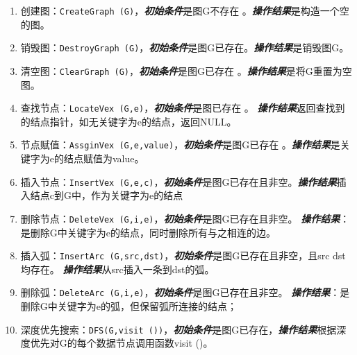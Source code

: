 \begin{enumerate}
\item 创建图：\texttt{CreateGraph (G)}，\newline \textbf{\emph{初始条件}}是图G不存在 。\newline \textbf{\emph{操作结果}}是构造一个空的图。
\item 销毁图：\texttt{DestroyGraph (G)}，\newline \textbf{\emph{初始条件}}是图G已存在。\newline \textbf{\emph{操作结果}}是销毁图G。
\item 清空图：\texttt{ClearGraph (G)}，\newline \textbf{\emph{初始条件}}是图G已存在 。\newline \textbf{\emph{操作结果}}是将G重置为空图。
\item 查找节点：\texttt{LocateVex (G,e)}，\newline \textbf{\emph{初始条件}}是图已存在 。\newline
    \textbf{\emph{操作结果}}返回查找到的结点指针，如无关键字为e的结点，返回NULL。
\item 节点赋值：\texttt{AssginVex (G,e,value)}，\newline \textbf{\emph{初始条件}}是图G已存在 。\newline \textbf{\emph{操作结果}}是关键字为e的结点赋值为value。
\item 插入节点：\texttt{InsertVex (G,e,c)}，\newline \textbf{\emph{初始条件}}是图G已存在且非空。\newline \textbf{\emph{操作结果}}插入结点c到G中，作为关键字为e的结点
\item 删除节点：\texttt{DeleteVex (G,i,e)}，\newline \textbf{\emph{初始条件}}是图G已存在且非空。\newline
    \textbf{\emph{操作结果}}：是删除G中关键字为e的结点，同时删除所有与之相连的边。
\item 插入弧：\texttt{InsertArc  (G,src,dst)}，\newline \textbf{\emph{初始条件}}是图G已存在且非空，且src dst均存在。\newline
    \textbf{\emph{操作结果}}从src插入一条到dst的弧。
\item 删除弧：\texttt{DeleteArc  (G,i,e)}，\newline \textbf{\emph{初始条件}}是图G已存在且非空。\newline
    \textbf{\emph{操作结果}}：是删除G中关键字为e的弧，但保留弧所连接的结点；
\item 深度优先搜索：\texttt{DFS(G,visit ())}，\newline \textbf{\emph{初始条件}}是图G已存在，\newline \textbf{\emph{操作结果}}根据深度优先对G的每个数据节点调用函数visit ()。

\end{enumerate}
